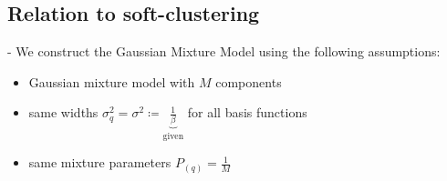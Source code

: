 \subsection{Relation to soft-clustering}


\begin{frame}{\subsecname}


\pause

- We construct the Gaussian Mixture Model using the following assumptions:
\begin{itemize}
	\item Gaussian mixture model with $M$ components
	\item same widths $\sigma_q^2 = \sigma^2 \coloneqq \underbrace{\frac{1}{\beta}}_{\text{given}}$ for all basis functions
	\item same mixture parameters $P_{(q)} = \frac{1}{M}$
\end{itemize}

\end{frame}

